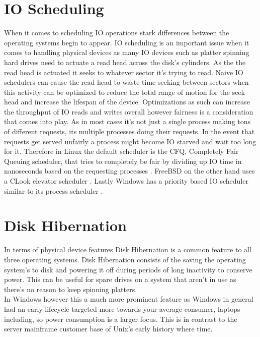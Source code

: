 \documentclass[letterpaper,10pt,draftclsnofoot,onecolumn]{IEEEtran}
\begin{document}
\section{IO Scheduling}
When it comes to scheduling IO operations stark differences between the operating systems begin to appear. IO scheduling is an important issue when it comes to handling physical devices as many IO devices such as platter spinning hard drives need to actuate a read head across the disk’s cylinders. As the the read head is actuated it seeks to whatever sector it’s trying to read. Naive IO schedulers can cause the read head to waste time seeking between sectors when this activity can be optimized to reduce the total range of motion for the seek head and increase the lifespan of the device. Optimizations as such can increase the throughput of IO reads and writes overall however fairness is a consideration that comes into play. As in most cases it’s not just a single process making tons of different requests, its multiple processes doing their requests. In the event that requests get served unfairly a process might become IO starved and wait too long for it. Therefore in Linux the default scheduler is the CFQ, Completely Fair Queuing scheduler, that tries to completely be fair by dividing up IO time in nanoseconds based on the requesting processes \cite{love}. FreeBSD on the other hand uses a CLook elevator scheduler \cite{mccusick}. Lastly Windows has a priority based IO scheduler similar to its process scheduler \cite{russinovich}.\\

\section{Disk Hibernation}
In terms of physical device features Disk Hibernation is a common feature to all three operating systems. Disk Hibernation consists of the saving the operating system’s to disk and powering it off during periods of long inactivity to conserve power. This can be useful for spare drives on a system that aren’t in use as there’s no reason to keep spinning platters.\\

In Windows however this a much more prominent feature as Windows in general had an early lifecycle targeted more towards your average consumer, laptops including, so power consumption is a larger focus. This is in contrast to the server mainframe customer base of Unix’s early history where time.\\



\end{document}
